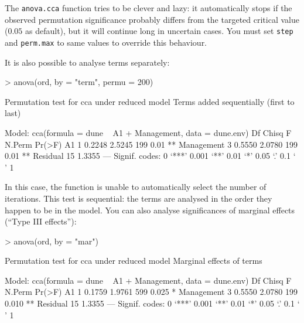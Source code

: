 \documentclass[a4paper,10pt]{amsart}
\begin{document}
The \texttt{anova.cca} function tries to be clever and lazy: it
automatically stops if the observed permutation significance probably
differs from the targeted critical value ($0.05$ as default), but it
will continue long in uncertain cases.  You must set \texttt{step} and
\texttt{perm.max} to same values to override this behaviour.

It is also possible to analyse terms separately:
\begin{Schunk}
\begin{Sinput}
> anova(ord, by = "term", permu = 200)
\end{Sinput}
\begin{Soutput}
Permutation test for cca under reduced model
Terms added sequentially (first to last)

Model: cca(formula = dune ~ A1 + Management, data = dune.env)
           Df  Chisq      F N.Perm Pr(>F)   
A1          1 0.2248 2.5245    199   0.01 **
Management  3 0.5550 2.0780    199   0.01 **
Residual   15 1.3355                        
---
Signif. codes:  0 ‘***’ 0.001 ‘**’ 0.01 ‘*’ 0.05 ‘.’ 0.1 ‘ ’ 1 
\end{Soutput}
\end{Schunk}
In this case, the function is unable to automatically select the
number of iterations. This test is sequential: the terms are analysed
in the order they happen to be in the model. You can also analyse
significances of marginal effects (``Type III effects''):
\begin{Schunk}
\begin{Sinput}
> anova(ord, by = "mar")
\end{Sinput}
\begin{Soutput}
Permutation test for cca under reduced model
Marginal effects of terms

Model: cca(formula = dune ~ A1 + Management, data = dune.env)
           Df  Chisq      F N.Perm Pr(>F)   
A1          1 0.1759 1.9761    599  0.025 * 
Management  3 0.5550 2.0780    199  0.010 **
Residual   15 1.3355                        
---
Signif. codes:  0 ‘***’ 0.001 ‘**’ 0.01 ‘*’ 0.05 ‘.’ 0.1 ‘ ’ 1 
\end{Soutput}
\end{Schunk}
\end{document}
